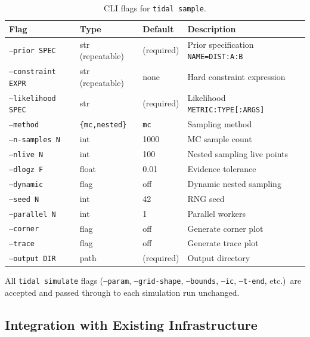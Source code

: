 \begin{table}[htbp]
\centering
\caption{CLI flags for \texttt{tidal sample}.}
\label{tab:sample-cli}
\begin{tabular}{@{}llll@{}}
\toprule
Flag & Type & Default & Description \\
\midrule
\texttt{--prior SPEC}       & str (repeatable) & (required) & Prior specification \texttt{NAME=DIST:A:B} \\
\texttt{--constraint EXPR}  & str (repeatable) & none       & Hard constraint expression \\
\texttt{--likelihood SPEC}  & str              & (required) & Likelihood \texttt{METRIC:TYPE[:ARGS]} \\
\texttt{--method}           & \texttt{\{mc,nested\}}    & \texttt{mc}    & Sampling method \\
\texttt{--n-samples N}      & int              & 1000       & MC sample count \\
\texttt{--nlive N}          & int              & 100        & Nested sampling live points \\
\texttt{--dlogz F}          & float            & 0.01       & Evidence tolerance \\
\texttt{--dynamic}          & flag             & off        & Dynamic nested sampling \\
\texttt{--seed N}           & int              & 42         & RNG seed \\
\texttt{--parallel N}       & int              & 1          & Parallel workers \\
\texttt{--corner}           & flag             & off        & Generate corner plot \\
\texttt{--trace}            & flag             & off        & Generate trace plot \\
\texttt{--output DIR}       & path             & (required) & Output directory \\
\bottomrule
\end{tabular}
\end{table}

All \texttt{tidal simulate} flags (\texttt{--param}, \texttt{--grid-shape},
\texttt{--bounds}, \texttt{--ic}, \texttt{--t-end}, etc.)\ are accepted and
passed through to each simulation run unchanged.

\subsection{Integration with Existing Infrastructure}
\label{sec:inference-integration}


